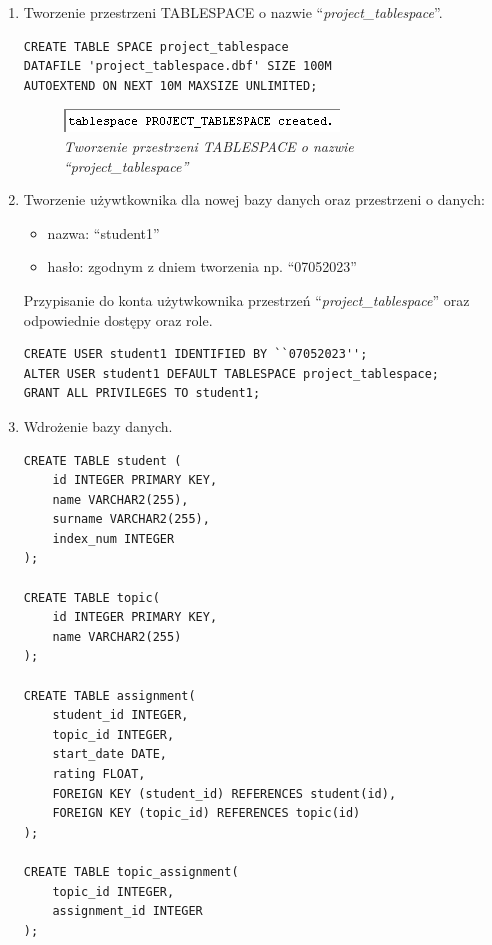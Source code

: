 \documentclass[a4paper, 10pt]{article}
\begin{document}
\begin{enumerate}
	\item Tworzenie przestrzeni TABLESPACE o nazwie ``\emph{project\_tablespace}''.
		\begin{lstlisting}[style=SQL, caption=\textit{Tworzenie przestrzeni TABLESPACE o nazwie ``project\_tablespace''}]
CREATE TABLE SPACE project_tablespace
DATAFILE 'project_tablespace.dbf' SIZE 100M
AUTOEXTEND ON NEXT 10M MAXSIZE UNLIMITED;
		\end{lstlisting}
		\begin{figure}[H]
			\centering
			\includegraphics{zadanie1.png}
			\caption{\textit{Tworzenie przestrzeni TABLESPACE o nazwie ``project\_tablespace''}}
		\end{figure}
	\item Tworzenie używtkownika dla nowej bazy danych oraz przestrzeni o danych:
		\begin{itemize}
			\item nazwa: ``student1''
			\item hasło: zgodnym z dniem tworzenia np. ``07052023''
		\end{itemize}
		Przypisanie do konta użytwkownika przestrzeń ``\emph{project\_tablespace}'' oraz odpowiednie dostępy oraz role.
		\begin{lstlisting}[style=SQL, caption=\textit{Tworzenie użytkownika}]
CREATE USER student1 IDENTIFIED BY ``07052023'';
ALTER USER student1 DEFAULT TABLESPACE project_tablespace;
GRANT ALL PRIVILEGES TO student1;
		\end{lstlisting}
	\item Wdrożenie bazy danych. 
		\begin{lstlisting}[style=SQL, caption=\textit{Wdrożenie bazy danych}]
CREATE TABLE student (
	id INTEGER PRIMARY KEY,
	name VARCHAR2(255),
	surname VARCHAR2(255),
	index_num INTEGER
);

CREATE TABLE topic(
	id INTEGER PRIMARY KEY,
	name VARCHAR2(255)
);

CREATE TABLE assignment(
	student_id INTEGER,
	topic_id INTEGER,
	start_date DATE,
	rating FLOAT,
	FOREIGN KEY (student_id) REFERENCES student(id),
	FOREIGN KEY (topic_id) REFERENCES topic(id)
);

CREATE TABLE topic_assignment(
	topic_id INTEGER,
	assignment_id INTEGER
);


\end{lstlisting}
\end{enumerate}
\end{document}
